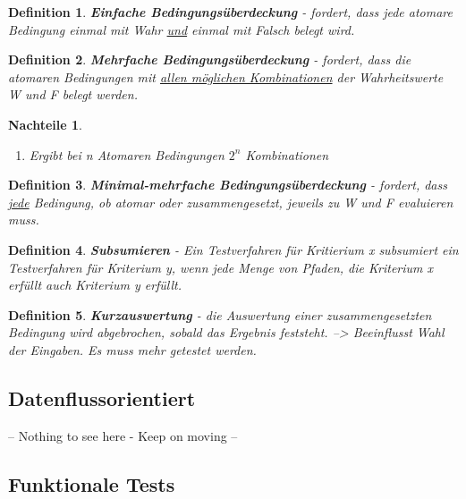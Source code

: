 \documentclass[a4paper]{article}
\theoremstyle{break}
\newtheorem{defi}{Definition}[section]
\newtheorem{whynot}{Nachteile}[section]
\begin{document}
        \begin{defi}
          \textbf{Einfache Bedingungsüberdeckung} - fordert, dass jede atomare Bedingung einmal mit Wahr \ul{und} einmal mit Falsch belegt wird.
        \end{defi}

        \begin{defi}
          \textbf{Mehrfache Bedingungsüberdeckung} - fordert, dass die atomaren Bedingungen mit \ul{allen möglichen Kombinationen} der Wahrheitswerte W und F belegt werden.
        \end{defi}

        \begin{whynot}
          \begin{enumerate}
          \item Ergibt bei n Atomaren Bedingungen \(2^n\) Kombinationen
          \end{enumerate}
        \end{whynot}

        \begin{defi}
          \textbf{Minimal-mehrfache Bedingungsüberdeckung} - fordert, dass \ul{jede} Bedingung, ob atomar oder zusammengesetzt, jeweils zu W und F evaluieren muss.
        \end{defi}

        \begin{defi}
          \textbf{Subsumieren} - Ein Testverfahren für Kritierium x subsumiert ein Testverfahren für Kriterium y, wenn jede Menge von Pfaden, die Kriterium x erfüllt auch Kriterium y erfüllt.
        \end{defi}

        
        \begin{defi}
          \textbf{Kurzauswertung} - die Auswertung einer zusammengesetzten Bedingung wird abgebrochen, sobald das Ergebnis feststeht.
          --> Beeinflusst Wahl der Eingaben. Es muss mehr getestet werden.
        \end{defi}
        
        \subsection{Datenflussorientiert}
        -- Nothing to see here - Keep on moving --
        \subsection{Funktionale Tests}
        
\end{document}
